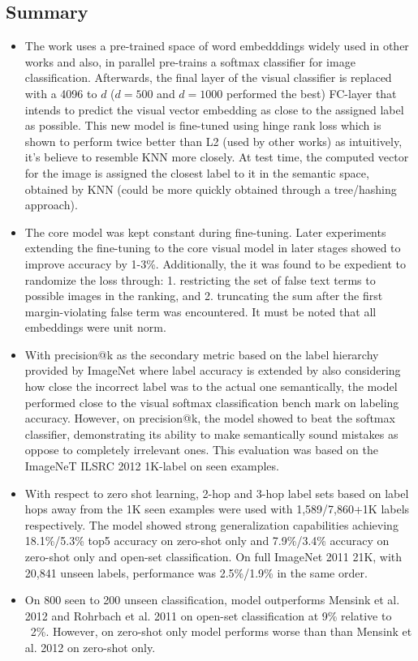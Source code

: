 \documentclass{article}
\begin{document}
\subsection{Summary}
\begin{itemize}
    \item The work uses a pre-trained space of word embedddings widely used in other works and also, in parallel pre-trains a softmax classifier for image classification. Afterwards, the final layer of the visual classifier is replaced with a 4096 to $d$ ($d=500$ and $d=1000$ performed the best) FC-layer that intends to predict the visual vector embedding as close to the assigned label as possible. This new model is fine-tuned using hinge rank loss which is shown to perform twice better than L2 (used by other works) as intuitively, it's believe to resemble KNN more closely. At test time, the computed vector for the image is assigned the closest label to it in the semantic space, obtained by KNN (could be more quickly obtained through a tree/hashing approach).
    \item The core model was kept constant during fine-tuning. Later experiments extending the fine-tuning to the core visual model in later stages showed to improve accuracy by 1-3\%. Additionally, the it was found to be expedient to randomize the loss through: 1. restricting the set of false text terms to possible images in the ranking, and 2. truncating the sum after the first margin-violating false term was encountered. It must be noted that all embeddings were unit norm.
    \item With precision@k as the secondary metric based on the label hierarchy provided by ImageNet where label accuracy is extended by also considering how close the incorrect label was to the actual one semantically, the model performed close to the visual softmax classification bench mark on labeling accuracy. However, on precision@k, the model showed to beat the softmax classifier, demonstrating its ability to make semantically sound mistakes as oppose to completely irrelevant ones. This evaluation was based on the ImageNeT ILSRC 2012 1K-label on seen examples.
    \item With respect to zero shot learning, 2-hop and 3-hop label sets based on label hops away from the 1K seen examples were used with 1,589/7,860+1K labels respectively. The model showed strong generalization capabilities achieving 18.1\%/5.3\% top5 accuracy on zero-shot only and 7.9\%/3.4\% accuracy on zero-shot only and open-set classification. On full ImageNet 2011 21K, with 20,841 unseen labels, performance was 2.5\%/1.9\% in the same order.
    \item On 800 seen to 200 unseen classification, model outperforms Mensink et al. 2012 and Rohrbach et al. 2011 on open-set classification at 9\% relative to ~2\%. However, on zero-shot only model performs worse than than Mensink et al. 2012 on zero-shot only.
\end{itemize}
\end{document}
